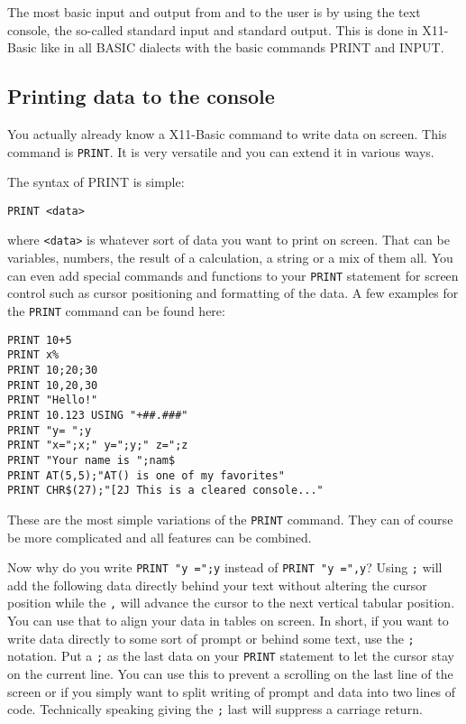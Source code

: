The most basic input and output from and to the user is by using the text 
console, the so-called standard input and standard output. This is done in 
X11-Basic like in all BASIC dialects with the basic commands PRINT and INPUT. 

\subsection{Printing data to the console}

You actually already know a X11-Basic command to write data on screen. This
command is \verb|PRINT|. It is very versatile and you can extend it in various
ways.

The syntax of PRINT is simple: 
\begin{verbatim}
PRINT <data>
\end{verbatim}
where \verb|<data>| is whatever sort of data you want to print on screen. That
can be variables, numbers, the result of a calculation, a string or a mix of
them all. You can even add special commands and functions to your \verb|PRINT|
statement for screen control such as cursor positioning and formatting of the
data. A few examples for the \verb|PRINT| command can be found here:

\begin{mdframed}[hidealllines=true,backgroundcolor=blue!20]
\begin{verbatim}
PRINT 10+5
PRINT x%
PRINT 10;20;30
PRINT 10,20,30
PRINT "Hello!"
PRINT 10.123 USING "+##.###"
PRINT "y= ";y
PRINT "x=";x;" y=";y;" z=";z
PRINT "Your name is ";nam$
PRINT AT(5,5);"AT() is one of my favorites"
PRINT CHR$(27);"[2J This is a cleared console..."
\end{verbatim}
\end{mdframed}

These are the most simple variations of the \verb|PRINT| command. They can of 
course be more complicated and all features can be combined.

Now why do you write \verb|PRINT "y =";y| instead of \verb|PRINT "y =",y|? 
Using \verb|;| will add the following data directly behind your text without
altering the cursor position while the \verb|,| will advance the cursor to the
next vertical tabular position. You can use that to align your data in tables
on screen. In short, if you want to write data directly to some sort of prompt
or behind some text, use the \verb|;| notation. Put a \verb|;| as the last data
on your \verb|PRINT| statement to let the cursor stay on the current line. You
can use this to prevent a scrolling on the last line of the screen or if you
simply want to split writing of prompt and data into two lines of code.
Technically speaking giving the \verb|;| last will suppress a carriage return.


